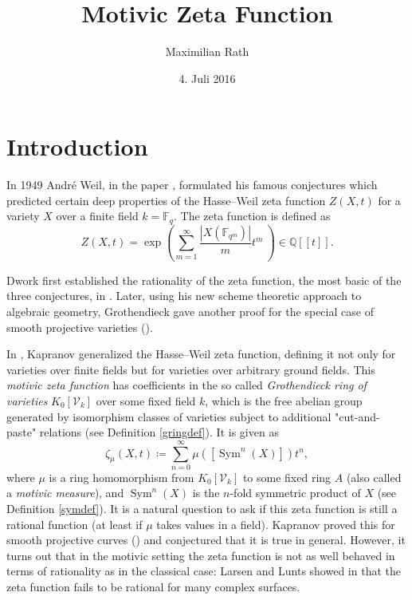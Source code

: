 \documentclass[11pt, a4paper, english, twoside]{article}
\author{Maximilian Rath}
\date{4. Juli 2016}
\title{Motivic Zeta Function}
\theoremstyle{plain}
\newtheorem{theorem}{Theorem}[section]
\theoremstyle{definition}
\newcommand{\gring}[1][k]{K_0[\mathcal{V}_#1]}
\DeclareMathOperator{\Sym}{Sym}
\begin{document}
\maketitle
\tableofcontents
\section{Introduction}

In 1949 Andr\'e Weil, in the paper \cite{weil1949}, formulated his famous conjectures
which predicted certain deep properties of the Hasse--Weil zeta function $Z(X,t)$ for a variety $X$ over a finite field $k = \mathbb{F}_q$.
The zeta function is defined as 
\[
    Z(X,t) = \exp \left(\sum_{m=1}^\infty \frac{|X(\mathbb{F}_{q^m})|}{m} t^m \ \right) \in \mathbb{Q}[[t]].
\]

Dwork first established the rationality of the zeta function, the most basic of the three conjectures, in \cite{Dwork}.
Later, using his new scheme theoretic approach to algebraic geometry, Grothendieck gave another proof for the special case of 
smooth projective varieties (\cite{GroRat}).


In \cite{kapranov}, Kapranov generalized the Hasse--Weil zeta function, defining it not only for varieties over finite fields
but for varieties over arbitrary ground fields. 
This \emph{motivic zeta function} has coefficients in the so called \emph{Grothendieck ring of varieties} $\gring[k]$ 
over some fixed field $k$, 
which is the free abelian group generated by isomorphism classes of varieties subject to additional "cut-and-paste" relations
(see Definition \ref{gringdef}). It is given as 
\[
    \zeta_{\mu}(X,t) \coloneqq \sum_{n=0}^{\infty} \mu \left( \left[ \Sym^n(X) \right] \right) t^n,
\]
where $\mu$ is a ring homomorphism from $\gring[k]$ to some fixed ring $A$ (also called a \emph{motivic measure}), 
and $\Sym^n(X)$ is the $n$-fold symmetric product of $X$ (see Definition \ref{symdef}). 
It is a natural question to ask if this zeta function is still a rational function (at least if $\mu$ takes values in a field).
Kapranov proved this for smooth projective curves (\cite[Thm. 1.1.9]{kapranov}) and conjectured that it is true in general.
However, it turns out that in the motivic setting the zeta function is not as well behaved in terms of rationality as in the classical case:
Larsen and Lunts showed in \cite{MR1996804} that the zeta function fails to be rational for many complex surfaces.
\end{document}
